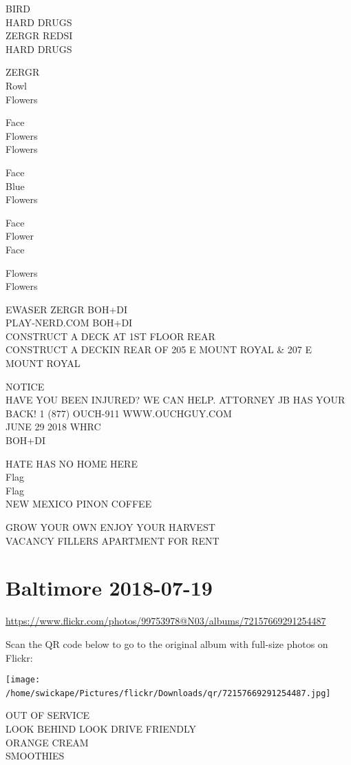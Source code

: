 \documentclass[10pt,letterpaper]{article}
\begin{document}
BIRD\\
HARD DRUGS\\
ZERGR REDSI\\
HARD DRUGS

ZERGR\\
Rowl\\
Flowers

Face\\
Flowers\\
Flowers

Face\\
Blue\\
Flowers

Face\\
Flower\\
Face

Flowers\\
Flowers

EWASER ZERGR BOH+DI\\
PLAY{-}NERD.COM BOH+DI\\
CONSTRUCT A DECK AT 1ST FLOOR REAR\\
CONSTRUCT A DECKIN REAR OF 205 E MOUNT ROYAL \& 207 E MOUNT ROYAL

NOTICE\\
HAVE YOU BEEN INJURED?  WE CAN HELP.  ATTORNEY JB HAS YOUR BACK!  1 (877) OUCH{-}911 WWW.OUCHGUY.COM\\
JUNE 29 2018 WHRC\\
BOH+DI

HATE HAS NO HOME HERE\\
Flag\\
Flag\\
NEW MEXICO PINON COFFEE

GROW YOUR OWN ENJOY YOUR HARVEST\\
VACANCY FILLERS APARTMENT FOR RENT
\

\section*{Baltimore 2018-07-19}

\url{https://www.flickr.com/photos/99753978@N03/albums/72157669291254487}

Scan the QR code below to go to the original album with full-size photos on Flickr:

\texttt{[image: /home/swickape/Pictures/flickr/Downloads/qr/72157669291254487.jpg]}
\

OUT OF SERVICE\\
LOOK BEHIND LOOK DRIVE FRIENDLY\\
ORANGE CREAM\\
SMOOTHIES
\end{document}
